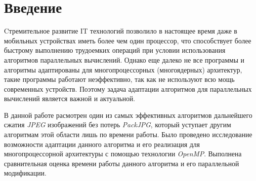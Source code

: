 \documentclass{matmex-diploma-custom}
\begin{document}
\maketitle
\tableofcontents
\newpage
\nocite{*}
\section*{Введение}

    Cтремительное развитие IT технологий позволило в настоящее время даже в мобильных устройствах иметь более чем один процессор, что способствует более быстрому выполнению трудоемких операций при условии использования алгоритмов параллельных вычислений. Однако еще далеко не все программы и алгоритмы адаптированы для многопроцессорных (многоядерных) архитектур, такие программы работают неэффективно, так как не используют всю мощь современных устройств. Поэтому задача адаптации алгоритмов для параллельных вычислений является важной и актуальной.

 В данной работе расмотрен один из самых эффективных алгоритмов дальнейшего сжатия \emph{JPEG}\cite{jpeg-spec} изображений без потерь \emph{PackJPG}\cite{offical-packjpg}, который уступает другим алгоритмам этой области лишь по времени работы. Было проведено исследование возможности адаптации данного алгоритма и его реализация для многопроцессорной архитектуры с помощью технологии \emph{OpenMP}\cite{}. Выполнена сравнительная оценка времени работы данного алгоритма и его параллельной модификации.
\end{document}
